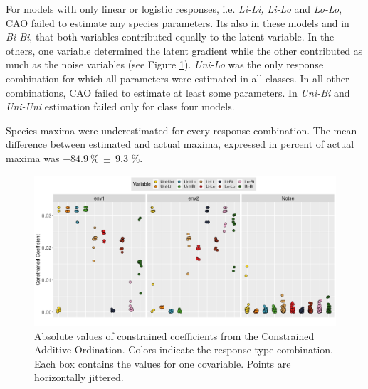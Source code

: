 	
		For	models with only linear or logistic responses, i.e. \textit{Li-Li, Li-Lo} and \textit{Lo-Lo}, CAO failed to estimate any species parameters. 
		Its also in these models and in \textit{Bi-Bi}, that both variables contributed equally to the latent variable. 
		In the others, one variable determined the latent gradient while the other contributed as much as the noise variables (see Figure \ref{fig:caoonlyone}). 
		\textit{Uni-Lo} was the only response combination for which all parameters were estimated in all classes. 
		In all other combinations, CAO failed to estimate at least some parameters.
		In \textit{Uni-Bi} and \textit{Uni-Uni} estimation failed only for class four models.
		
		Species maxima were underestimated for every response combination. 
		The mean difference between estimated and actual maxima, expressed in percent of actual maxima was $-84.9\ \%\ \pm\ 9.3$ \%.\\ 
	
	\begin{figure}[h!]
		\centering
		\includegraphics[width=1\linewidth]{../02_Figures/CAO_loadings}
		\caption{
			Absolute values of constrained coefficients from the Constrained Additive Ordination. 
			Colors indicate the response type combination. 
			Each box contains the values for one covariable. 
			Points are horizontally jittered.
		}
		\label{fig:caoonlyone}
	\end{figure}


	
